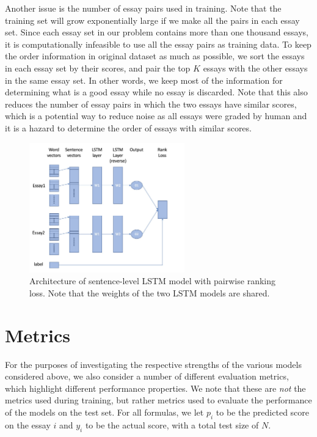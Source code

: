 \documentclass[10pt,psamsfonts]{amsart}
\theoremstyle{definition}
\theoremstyle{remark}
\numberwithin{equation}{section}
\begin{document}
Another issue is the number of essay pairs used in training. Note that the training set will grow exponentially large if we make all the pairs in each essay set. Since each essay set in our problem contains more than one thousand essays, it is computationally infeasible to use all the essay pairs as training data. To keep the order information in original dataset as much as possible, we sort the essays in each essay set by their scores, and pair the top $K$ essays with the other essays in the same essay set. In other words, we keep most of the information for determining what is a good essay while no essay is discarded. Note that this also reduces the number of essay pairs in which the two essays have similar scores, which is a potential way to reduce noise as all essays were graded by human and it is a hazard to determine the order of essays with similar scores.

\begin{figure}
	\includegraphics[width=0.6\textwidth]{rankmodel.jpg}
	\caption{Architecture of sentence-level LSTM model with pairwise ranking loss. Note that the weights of the two LSTM models are shared.}
	\label{fig:rankmodel}
\end{figure}


\section*{Metrics}

For the purposes of investigating the respective strengths of the various models considered above, we also consider a number of different evaluation metrics, which highlight different performance properties. We note that these are {\em not} the metrics used during training, but rather metrics used to evaluate the performance of the models on the test set. For all formulas, we let $p_i$ to be the predicted score on the essay $i$ and $y_i$ to be the actual score, with a total test size of $N$.
\end{document}
